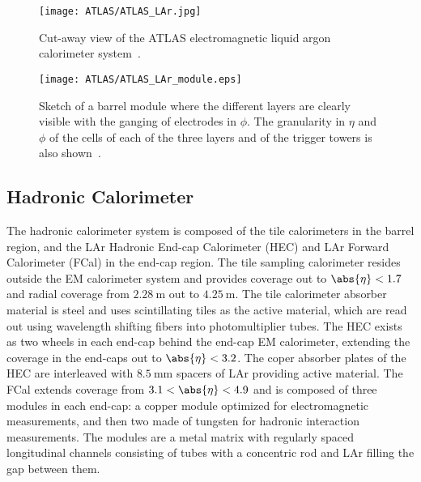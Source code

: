 \begin{figure}[htbp]
 \centering
 \texttt{[image: ATLAS/ATLAS\_LAr.jpg]}
 \caption[Cut-away view of the ATLAS electromagnetic liquid argon calorimeter system.]{%
  Cut-away view of the ATLAS electromagnetic liquid argon calorimeter system~\cite{Pequenao:1095927}.}\label{fig:ATLAS_LAr}
\end{figure}

\begin{figure}[htbp]
 \centering
 \texttt{[image: ATLAS/ATLAS\_LAr\_module.eps]}
 \caption[Sketch of a liquid argon calorimeter system barrel module detailing granularity in $\eta$ and $\phi$.]{%
  Sketch of a barrel module where the different layers are clearly visible with the ganging of electrodes in $\phi$.
  The granularity in $\eta$ and $\phi$ of the cells of each of the three layers and of the trigger towers is also shown~\cite{PERF-2007-01}.}\label{fig:ATLAS_LAr_module}
\end{figure}

\subsection{Hadronic Calorimeter}\label{sec:ATLAS_hadronic_calorimeter}

The hadronic calorimeter system is composed of the tile calorimeters in the barrel region, and the LAr Hadronic End-cap Calorimeter (HEC) and LAr Forward Calorimeter (FCal) in the end-cap region.
The tile sampling calorimeter resides outside the EM calorimeter system and provides coverage out to $\abs{\eta} < 1.7$ and radial coverage from $2.28~\mathrm{m}$ out to $4.25~\mathrm{m}$.
The tile calorimeter absorber material is steel and uses scintillating tiles as the active material, which are read out using wavelength shifting fibers into photomultiplier tubes.
The HEC exists as two wheels in each end-cap behind the end-cap EM calorimeter, extending the coverage in the end-caps out to $\abs{\eta} < 3.2$.
The coper absorber plates of the HEC are interleaved with $8.5~\mathrm{mm}$ spacers of LAr providing active material.
The FCal extends coverage from $3.1 < \abs{\eta} < 4.9$ and is composed of three modules in each end-cap: a copper module optimized for electromagnetic measurements, and then two made of tungsten for hadronic interaction measurements.
The modules are a metal matrix with regularly spaced longitudinal channels consisting of tubes with a concentric rod and LAr filling the gap between them.\\

